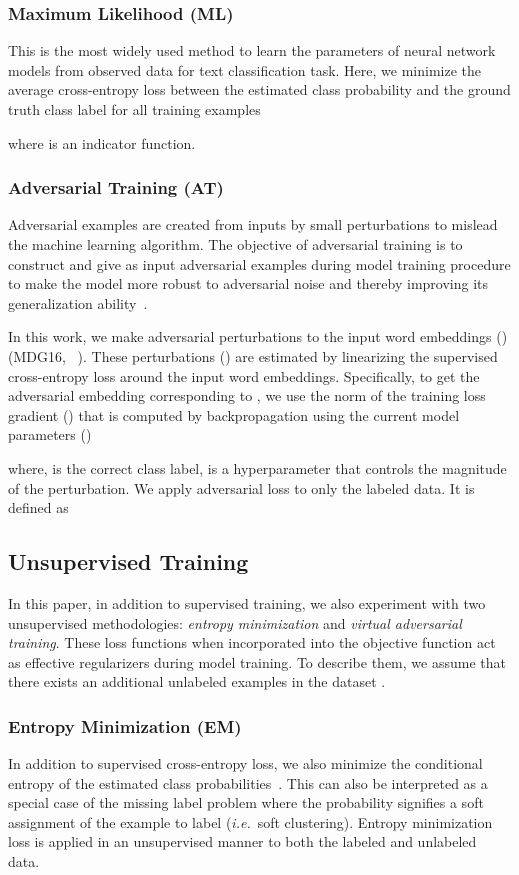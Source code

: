 \documentclass[letterpaper]{article}
\newcommand{\citep}{\cite}
\newcommand{\citealp}[1]{\citeauthor{#1} \citeyear{#1}}
\begin{document}
\subsubsection*{\textbf{Maximum Likelihood (ML)}} This is the most widely used method to learn the parameters of neural network models from observed data for text classification task. Here, we minimize the average cross-entropy loss between the estimated class probability and the ground truth class label for all training examples

where  is an indicator function.

\subsubsection*{\textbf{Adversarial Training (AT)}} Adversarial examples are created from inputs by small perturbations to mislead the machine learning algorithm. The objective of adversarial training is to construct and give as input adversarial examples during model training procedure to make the model more robust to adversarial noise and thereby improving its generalization ability~\citep{goodfellow2014explaining}. 

In this work, we make adversarial perturbations to the input word embeddings () (MDG16,~\citealp{miyato2016adversarial}). These perturbations () are estimated by linearizing the supervised cross-entropy loss around the input word embeddings. Specifically, to get the adversarial embedding  corresponding to , we use the  norm of the training loss gradient () that is computed by backpropagation using the current model parameters ()

where,  is the correct class label,  is a hyperparameter that controls the magnitude of the perturbation. We apply adversarial loss to only the labeled data. It is defined as


\subsection{Unsupervised Training}
In this paper, in addition to supervised training, we also experiment with two unsupervised methodologies: \emph{entropy minimization} and \emph{virtual adversarial training}.  These loss functions when incorporated into the objective function act as effective regularizers during model training. To describe them, we assume that there exists an additional  unlabeled examples in the dataset .

\subsubsection{\textbf{Entropy Minimization (EM)}} In addition to supervised cross-entropy loss, we also minimize the conditional entropy of the estimated class probabilities~\citep{grandvalet2005semi,miyato2017virtual}. This can also be interpreted as a special case of the missing label problem where the probability  signifies a soft assignment of the  example to label  (\emph{i.e.}\ soft clustering). Entropy minimization loss is applied in an unsupervised manner to both the labeled and unlabeled data.
\end{document}
